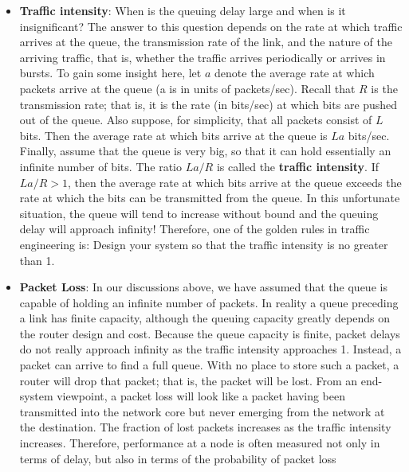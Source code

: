 \documentclass{report}
\begin{document}
\begin{itemize}
            \bigbreak \noindent 
            The propagation delay is the distance between two routers divided by the propagation speed. That is, the propagation delay is d/s, where d is the distance between router A and router B and s is the propagation speed of the link. Once the last bit of the packet propagates to node B, it and all the preceding bits of the packet are stored in router B. The whole process then continues with router B now performing the forwarding. In wide-area networks, propagation delays are on the order of milliseconds.
        \item \textbf{Traffic intensity}: 
            When is the queuing delay large and when is it insignificant? The answer to this question depends on the rate at which traffic arrives at the queue, the transmission rate of the link, and the nature of the arriving traffic, that is, whether the traffic arrives periodically or arrives in bursts. To gain some insight here, let $a$ denote the average rate at which packets arrive at the queue (a is in units of packets/sec). Recall that $R$ is the transmission rate; that is, it is the rate (in bits/sec) at which bits are pushed out of the queue. Also suppose, for simplicity, that all packets consist of $L$ bits. Then the average rate at which bits arrive at the queue is $La$ bits/sec. Finally, assume that the queue is very big, so that it can hold essentially an infinite number of bits. The ratio $La/R$ is called the \textbf{traffic intensity}.
            \bigbreak \noindent 
            If $La/R > 1$, then the average rate at which bits arrive at the queue exceeds the rate at which the bits can be transmitted from the queue. In this unfortunate situation, the queue will tend to increase without bound and the queuing delay will approach infinity! Therefore, one of the golden rules in traffic engineering is: Design your system so that the traffic intensity is no greater than 1.
        \item \textbf{Packet Loss}: In our discussions above, we have assumed that the queue is capable of holding an infinite number of packets. In reality a queue preceding a link has finite capacity, although the queuing capacity greatly depends on the router design and cost. Because the queue capacity is finite, packet delays do not really approach infinity as the traffic intensity approaches 1. Instead, a packet can arrive to find a full queue. With no place to store such a packet, a router will drop that packet; that is, the packet will be lost. 
            \bigbreak \noindent 
            From an end-system viewpoint, a packet loss will look like a packet having been transmitted into the network core but never emerging from the network at the destination. The fraction of lost packets increases as the traffic intensity increases. Therefore, performance at a node is often measured not only in terms of delay, but also in terms of the probability of packet loss

\end{itemize}
\end{document}
